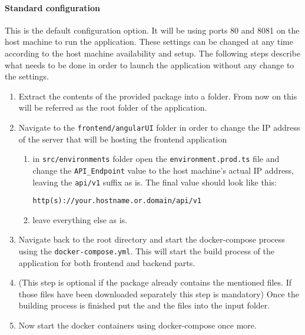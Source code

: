 \documentclass{scrreprt}
\begin{document}
\paragraph{Standard configuration} This is the default configuration option. It will be using ports 80 and 8081 on the host machine to run the application. These settings can be changed at any time according to the host machine availability and setup. The following steps describe what needs to be done in order to launch the application without any change to the settings.
\begin{enumerate}
	\item Extract the contents of the provided package into a folder. From now on this will be referred as the root folder of the application.
	\item Navigate to the \texttt{frontend/angularUI} folder in order to change the IP address of the server that will be hosting the frontend application
		\begin{enumerate}
			\item in \texttt{src/environments} folder open the \texttt{environment.prod.ts} file and change the \texttt{API\_Endpoint} value to the host machine's actual IP address, leaving the \texttt{api/v1} suffix as is. The final value should look like this: 
			
			\texttt{http(s)://your.hostname.or.domain/api/v1}
			\item leave everything else as is.
		\end{enumerate}
	\item Navigate back to the root directory and start the docker-compose process using the \texttt{docker-compose.yml}. This will start the build process of the application for both frontend and backend parts.	
	\item (This step is optional if the package already contains the mentioned files. If those files have been downloaded separately this step is mandatory) Once the building process is finished put the \jaxb \space and the \model \space files into the input folder.
	\item Now start the docker containers using docker-compose once more.
\end{enumerate}
\end{document}
